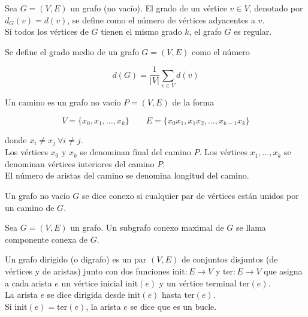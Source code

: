\begin{defi}
Sea $G = (V,E)$ un grafo (no vacío). El grado de un vértice $v \in V$, denotado por $d_G(v) = d(v)$, se define como el número de vértices adyacentes a $v$.\\

Si todos los vértices de $G$ tienen el mismo grado $k$, el grafo $G$ es regular.
\end{defi}

\begin{defi}
Se define el grado medio de un grafo $G = (V,E)$ como el número

\begin{equation}
d(G) = \dfrac{1}{|V|} \sum_{v \in V} d(v)
\end{equation}
\end{defi}

\begin{defi}
Un camino es un grafo no vacío $P = (V, E)$ de la forma

\begin{equation*}
V = \{ x_0,x_1,\dots,x_k\} \quad \quad E = \{ x_0 x_1, x_1 x_2, \dots, x_{k-1}x_k \}
\end{equation*}

donde $x_i \neq x_j \ \forall i \neq j$.\\

Los vértices $x_0$ y $x_k$ se denominan final del camino $P$. Los vértices $x_1, \dots, x_k$ se denominan vértices interiores del camino $P$.\\

El número de aristas del camino se denomina longitud del camino.
\end{defi}

\begin{defi}
Un grafo no vacío $G$ se dice conexo si cualquier par de vértices están unidos por un camino de $G$.
\end{defi}

\begin{defi}
Sea $G = (V,E)$ un grafo. Un subgrafo conexo maximal de $G$ se llama componente conexa de $G$.
\end{defi}

\begin{defi}
Un grafo dirigido (o digrafo) es un par $(V,E)$ de conjuntos disjuntos (de vértices y de aristas) junto con dos funciones $\mathrm{init} : E \to V$ y $\mathrm{ter} : E \to V$ que asigna a cada arista $e$ un vértice inicial $\mathrm{init}(e)$ y un vértice terminal $\mathrm{ter}(e)$.\\

La arista $e$ se dice dirigida desde $\mathrm{init}(e)$ hasta $\mathrm{ter}(e)$.\\

Si $\mathrm{init}(e) = \mathrm{ter}(e)$, la arista $e$ se dice que es un bucle.
\end{defi}

